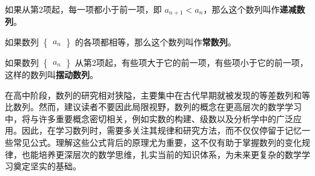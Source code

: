 如果从第2项起，每一项都小于前一项，即 $a_{n+1}<a_n$，那么这个数列叫作\textbf{递减数列}。

如果数列 $\begin{Bmatrix} a_n \end{Bmatrix}$ 的各项都相等，那么这个数列叫作\textbf{常数列}。

如果数列 $\begin{Bmatrix} a_n \end{Bmatrix}$ 从第2项起，有些项大于它的前一项，有些项小于它的前一项，这样的数列叫\textbf{摆动数列}。


在高中阶段，数列的研究相对狭隘，主要集中在古代早期就被发现的等差数列和等比数列。然而，建议读者不要因此局限视野，数列的概念在更高层次的数学学习中，将与许多重要概念密切相关，例如实数的构建、级数以及分析学中的广泛应用。因此，在学习数列时，需要多关注其规律和研究方法，而不仅仅停留于记忆一些常见公式。理解这些公式背后的原理尤为重要，这不仅有助于掌握数列的变化规律，也能培养更深层次的数学思维，扎实当前的知识体系，为未来更复杂的数学学习奠定坚实的基础。